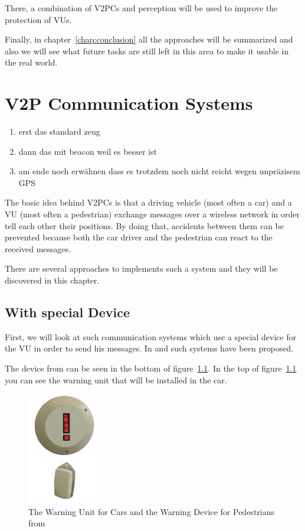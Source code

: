 \documentclass[]{ccs-thesis}
\begin{document}
There, a combination of \acp{V2PC} and perception will be used to improve the protection of \acp{VU}.

Finally, in chapter~\ref{chap:conclusion} all the approaches will be summarized and also we will see what future tasks are still left in this area to make it usable in the real world.


\chapter{V2P Communication Systems}
\label{chap:v2p}

\begin{enumerate}
\item erst das standard zeug 
\item dann das mit beacon weil es besser ist
\item am ende noch erwähnen dass es trotzdem noch nicht reicht wegen unpräzisem GPS
\end{enumerate}

The basic idea behind \acp{V2PC} is that a driving vehicle (most often a car) and a \ac{VU} (most often a pedestrian) exchange messages over a wireless network in order tell each other their positions. By doing that, accidents between them can be prevented because both the car driver and the pedestrian can react to the received messages.

There are several approaches to implements such a system and they will be discovered in this chapter.

\section{With special Device}\label{sec:special device}

First, we will look at such communication systems which use a special device for the \ac{VU} in order to send his messages. In \cite{v2pprotection} and \cite{watchover} such systems have been proposed. 

The device from \cite{v2pprotection} can be seen in the bottom of figure~\ref{fig:device}. In the top of figure~\ref{fig:device} you can see the warning unit that will be installed in the car.

\begin{figure}[h]
	\centering
	\includegraphics[width=0.3\textwidth]{figures/1_device}
	\caption{The Warning Unit for Cars and the Warning Device for Pedestrians from \cite{v2pprotection}}%
	\label{fig:device}%
\end{figure}
\end{document}
